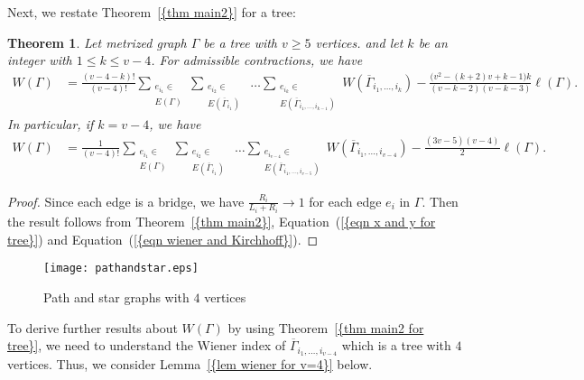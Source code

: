 \documentclass[12pt]{amsart}
\newtheorem{theorem}{Theorem}[section]
\theoremstyle{example}
\theoremstyle{definition}
\theoremstyle{notation}
\begin{document}
Next, we restate {Theorem~\ref{{thm main2}}} for a tree:
\begin{theorem}\label{thm main2 for tree}
Let metrized graph ${\Gamma}$ be a tree with $v \geq 5$ vertices.
and let $k$ be an integer with $1 \leq k \leq v-4$. For admissible contractions, we have
\begin{equation*}
\begin{split}
W({\Gamma})&= \frac{(v-4-k)!}{(v-4)!}\sum_{\substack{e_{i_1} \in
\\ {E({\Gamma})}}} \sum_{\substack{e_{i_2} \in
\\ {E({{{\overline{\Gamma}}}_{i_1}})}}}
\; \dots
\sum_{ \substack{e_{i_k} \in
\\ {E({{{\overline{\Gamma}}}_{i_1, \dots, i_{k-1}}})}} }
 W({{\overline{\Gamma}}}_{i_1,\dots, i_k})
-\frac{\big(v^2-(k+2)v+k-1 \big)k}{(v-k-2)(v-k-3) } {\ell ({\Gamma})}.
\end{split}
\end{equation*}
In particular, if $k=v-4$, we have
\begin{equation*}
\begin{split}
W({\Gamma})&= \frac{1}{(v-4)!}\sum_{\substack{e_{i_1} \in
\\ {E({\Gamma})}}} \sum_{\substack{e_{i_2} \in
\\ {E({{{\overline{\Gamma}}}_{i_1}})}}}
\; \dots
\sum_{ \substack{e_{i_{v-4}} \in
\\ {E({{{\overline{\Gamma}}}_{i_1, \dots, i_{v-5}}})}} }
 W({{\overline{\Gamma}}}_{i_1,\dots, i_{v-4}})
-\frac{(3v-5)(v-4)}{ 2} {\ell ({\Gamma})}.
\end{split}
\end{equation*}
\end{theorem}
\begin{proof}
Since each edge is a bridge, we have $\frac{R_{i}}{{L_{i}}+{R_{i}}} \longrightarrow 1$ for each edge $e_i$ in ${\Gamma}$.
Then the result follows from {Theorem~\ref{{thm main2}}}, {Equation~(\ref{{eqn x and y for tree}})} and {Equation~(\ref{{eqn wiener and Kirchhoff}})}.
\end{proof}
\begin{figure}
\centering
\texttt{[image: pathandstar.eps]} \caption{Path and star graphs with $4$ vertices} \label{fig pathstar}
\end{figure}
To derive further results about $W({\Gamma})$ by using {Theorem~\ref{{thm main2 for tree}}}, we need to understand the Wiener index of ${{\overline{\Gamma}}}_{i_1,\dots, i_{v-4}}$ which is a tree with $4$ vertices. Thus, we consider {Lemma~\ref{{lem wiener for v=4}}} below.
\end{document}
